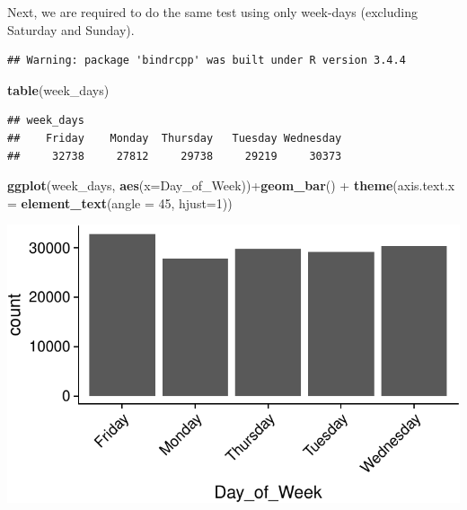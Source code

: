 \documentclass[]{article}
\newenvironment{Shaded}{\begin{snugshade}}{\end{snugshade}}
\newcommand{\KeywordTok}[1]{\textcolor[rgb]{0.13,0.29,0.53}{\textbf{{#1}}}}
\newcommand{\DataTypeTok}[1]{\textcolor[rgb]{0.13,0.29,0.53}{{#1}}}
\newcommand{\DecValTok}[1]{\textcolor[rgb]{0.00,0.00,0.81}{{#1}}}
\newcommand{\StringTok}[1]{\textcolor[rgb]{0.31,0.60,0.02}{{#1}}}
\newcommand{\CommentTok}[1]{\textcolor[rgb]{0.56,0.35,0.01}{\textit{{#1}}}}
\newcommand{\NormalTok}[1]{{#1}}
\begin{document}
Next, we are required to do the same test using only week-days
(excluding Saturday and Sunday).

\begin{Shaded}
\end{Shaded}

\begin{verbatim}
## Warning: package 'bindrcpp' was built under R version 3.4.4
\end{verbatim}

\begin{Shaded}
\begin{Highlighting}[]
\KeywordTok{table}\NormalTok{(week_days)}
\end{Highlighting}
\end{Shaded}

\begin{verbatim}
## week_days
##    Friday    Monday  Thursday   Tuesday Wednesday 
##     32738     27812     29738     29219     30373
\end{verbatim}

\begin{Shaded}
\begin{Highlighting}[]
\KeywordTok{ggplot}\NormalTok{(week_days, }\KeywordTok{aes}\NormalTok{(}\DataTypeTok{x=}\NormalTok{Day_of_Week))+}\KeywordTok{geom_bar}\NormalTok{() +}
\StringTok{  }\KeywordTok{theme}\NormalTok{(}\DataTypeTok{axis.text.x =} \KeywordTok{element_text}\NormalTok{(}\DataTypeTok{angle =} \DecValTok{45}\NormalTok{, }\DataTypeTok{hjust=}\DecValTok{1}\NormalTok{)) }
\end{Highlighting}
\end{Shaded}

\includegraphics{READMEv2_files/figure-latex/unnamed-chunk-14-1.pdf}
\end{document}
